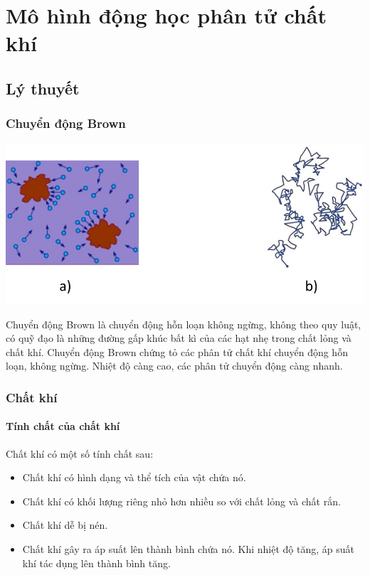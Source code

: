 \let\lesson\undefined
\newcommand{\lesson}{\phantomlesson{Bài 5: Mô hình động học phân tử chất khí}}
\chapter[Mô hình động học phân tử chất khí]{Mô hình động học phân tử chất khí}
\section{Lý thuyết}
\subsection{Chuyển động Brown}
\begin{center}
	\includegraphics[width=0.5\linewidth]{../figs/VN12-Y24-PH-SYL-009-1}
\end{center}
Chuyển động Brown là chuyển động hỗn loạn không ngừng, không theo quy luật, có quỹ đạo là những đường gấp khúc bất kì của các hạt nhẹ trong chất lỏng và chất khí. Chuyển động Brown chứng tỏ các phân tử chất khí chuyển động hỗn loạn, không ngừng. Nhiệt độ càng cao, các phân tử chuyển động càng nhanh.
\subsection{Chất khí}
\subsubsection{Tính chất của chất khí}
Chất khí có một số tính chất sau:
\begin{itemize}
	\item Chất khí có hình dạng và thể tích của vật chứa nó.
	\item Chất khí có khối lượng riêng nhỏ hơn nhiều so với chất lỏng và chất rắn.
	\item Chất khí dễ bị nén.
	\item Chất khí gây ra áp suất lên thành bình chứa nó. Khi nhiệt độ tăng, áp suất khí tác dụng lên thành bình tăng.
\end{itemize}
